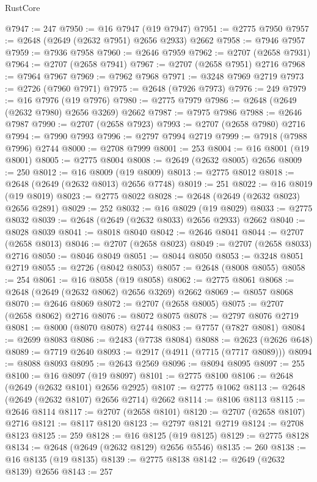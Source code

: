 \begin{lexlean}{RustCore}
\begin{coremodule}
@7947 := 247
@7950 := @16 @7947 (@19 @7947)
@7951 := @2775 @7950
@7957 := @2648 (@2649 (@2632 @7951) @2656 @2933) @2662
@7958 := @7946 @7957
@7959 := @7936 @7958
@7960 := @2646 @7959
@7962 := @2707 (@2658 @7931)
@7964 := @2707 (@2658 @7941)
@7967 := @2707 (@2658 @7951) @2716
@7968 := @7964 @7967
@7969 := @7962 @7968
@7971 := @3248 @7969 @2719
@7973 := @2726 (@7960 @7971)
@7975 := @2648 (@7926 @7973)
@7976 := 249
@7979 := @16 @7976 (@19 @7976)
@7980 := @2775 @7979
@7986 := @2648 (@2649 (@2632 @7980) @2656 @3269) @2662
@7987 := @7975 @7986
@7988 := @2646 @7987
@7990 := @2707 (@2658 @7923)
@7993 := @2707 (@2658 @7980) @2716
@7994 := @7990 @7993
@7996 := @2797 @7994 @2719
@7999 := @7918 (@7988 @7996) @2744
@8000 := @2708 @7999
@8001 := 253
@8004 := @16 @8001 (@19 @8001)
@8005 := @2775 @8004
@8008 := @2649 (@2632 @8005) @2656
@8009 := 250
@8012 := @16 @8009 (@19 @8009)
@8013 := @2775 @8012
@8018 := @2648 (@2649 (@2632 @8013) @2656 @7748)
@8019 := 251
@8022 := @16 @8019 (@19 @8019)
@8023 := @2775 @8022
@8028 := @2648 (@2649 (@2632 @8023) @2656 @2891)
@8029 := 252
@8032 := @16 @8029 (@19 @8029)
@8033 := @2775 @8032
@8039 := @2648 (@2649 (@2632 @8033) @2656 @2933) @2662
@8040 := @8028 @8039
@8041 := @8018 @8040
@8042 := @2646 @8041
@8044 := @2707 (@2658 @8013)
@8046 := @2707 (@2658 @8023)
@8049 := @2707 (@2658 @8033) @2716
@8050 := @8046 @8049
@8051 := @8044 @8050
@8053 := @3248 @8051 @2719
@8055 := @2726 (@8042 @8053)
@8057 := @2648 (@8008 @8055)
@8058 := 254
@8061 := @16 @8058 (@19 @8058)
@8062 := @2775 @8061
@8068 := @2648 (@2649 (@2632 @8062) @2656 @3269) @2662
@8069 := @8057 @8068
@8070 := @2646 @8069
@8072 := @2707 (@2658 @8005)
@8075 := @2707 (@2658 @8062) @2716
@8076 := @8072 @8075
@8078 := @2797 @8076 @2719
@8081 := @8000 (@8070 @8078) @2744
@8083 := @7757 (@7827 @8081)
@8084 := @2699 @8083
@8086 := @2483 (@7738 @8084)
@8088 := @2623 (@2626 @648)
@8089 := @7719 @2640
@8093 := @2917 (@4911 (@7715 (@7717 @8089)))
@8094 := @8088 @8093
@8095 := @2643 @2569
@8096 := @8094 @8095
@8097 := 255
@8100 := @16 @8097 (@19 @8097)
@8101 := @2775 @8100
@8106 := @2648 (@2649 (@2632 @8101) @2656 @2925)
@8107 := @2775 @1062
@8113 := @2648 (@2649 (@2632 @8107) @2656 @2714) @2662
@8114 := @8106 @8113
@8115 := @2646 @8114
@8117 := @2707 (@2658 @8101)
@8120 := @2707 (@2658 @8107) @2716
@8121 := @8117 @8120
@8123 := @2797 @8121 @2719
@8124 := @2708 @8123
@8125 := 259
@8128 := @16 @8125 (@19 @8125)
@8129 := @2775 @8128
@8134 := @2648 (@2649 (@2632 @8129) @2656 @5546)
@8135 := 260
@8138 := @16 @8135 (@19 @8135)
@8139 := @2775 @8138
@8142 := @2649 (@2632 @8139) @2656
@8143 := 257

\end{coremodule}
\end{lexlean}
